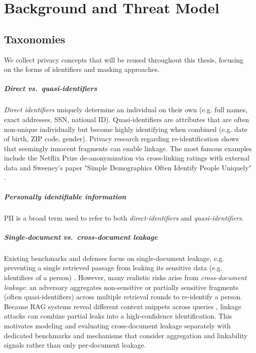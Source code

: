 \chapter{Background and Threat Model}\label{chapter:background}
\section{Taxonomies}
We collect privacy concepts that will be reused throughout this thesis, focusing on the forms of identifiers and masking approaches.

\paragraph{Direct vs.\ quasi-identifiers}
\textit{Direct identifiers} uniquely determine an individual on their own (e.g. full names, exact addresses, SSN, national ID). Quasi-identifiers are attributes that are often non-unique individually but become highly identifying when combined (e.g. date of birth, ZIP code, gender). Privacy research regarding re-identification shows that seemingly innocent fragments can enable linkage. The most famous examples include the Netflix Prize de-anonymization via cross-linking ratings with external data \cite{netflixDeAnon} and Sweeney's paper "Simple Demographics Often Identify People Uniquely" \cite{simpleDemographic}. 

\paragraph{Personally identifiable information}
\ac{PII} is a broad term used to refer to both \textit{direct-identifiers} and \textit{quasi-identifiers}.

\paragraph{Single-document vs.\ cross-document leakage}
Existing benchmarks and defenses focus on single-document leakage, e.g. preventing a single retrieved passage from leaking its sensitive data (e.g. identifiers of a person) \cite{ragSAGE, goodAndBad}. However, many realistic risks arise from \textit{cross-document leakage}: an adversary aggregates non-sensitive or partially sensitive fragments (often quasi-identifiers) across multiple retrieval rounds to re-identify a person. Because RAG systems reveal different context snippets across queries \cite{ragThief}, linkage attacks can combine partial leaks into a high-confidence identification. This motivates modeling and evaluating cross-document leakage separately with dedicated benchmarks and mechanisms that consider aggregation and linkability signals rather than only per-document leakage.

